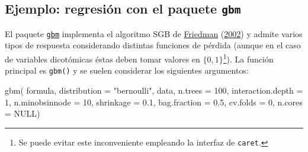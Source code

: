\documentclass[
  spanish,
]{book}
\newenvironment{Shaded}{\begin{snugshade}}{\end{snugshade}}
\newcommand{\AttributeTok}[1]{\textcolor[rgb]{0.77,0.63,0.00}{#1}}
\newcommand{\ConstantTok}[1]{\textcolor[rgb]{0.00,0.00,0.00}{#1}}
\newcommand{\DecValTok}[1]{\textcolor[rgb]{0.00,0.00,0.81}{#1}}
\newcommand{\FloatTok}[1]{\textcolor[rgb]{0.00,0.00,0.81}{#1}}
\newcommand{\FunctionTok}[1]{\textcolor[rgb]{0.00,0.00,0.00}{#1}}
\newcommand{\NormalTok}[1]{#1}
\newcommand{\StringTok}[1]{\textcolor[rgb]{0.31,0.60,0.02}{#1}}
\theoremstyle{break}
\theoremstyle{definition}
\theoremstyle{definition}
\theoremstyle{definition}
\theoremstyle{definition}
\theoremstyle{remark}
\begin{document}
\hypertarget{ejemplo-regresiuxf3n-con-el-paquete-gbm}{%
\subsection{\texorpdfstring{Ejemplo: regresión con el paquete \texttt{gbm}}{Ejemplo: regresión con el paquete gbm}}\label{ejemplo-regresiuxf3n-con-el-paquete-gbm}}

El paquete \href{https://CRAN.R-project.org/package=gbm}{\texttt{gbm}} implementa el algoritmo SGB de \protect\hyperlink{ref-friedman2002stochastic}{Friedman} (\protect\hyperlink{ref-friedman2002stochastic}{2002}) y admite varios tipos de respuesta considerando distintas funciones de pérdida (aunque en el caso de variables dicotómicas éstas deben tomar valores en \(\{0, 1\}\)\footnote{Se puede evitar este inconveniente empleando la interfaz de \texttt{caret}.}).
La función principal es \texttt{gbm()} y se suelen considerar los siguientes argumentos:

\begin{Shaded}
\begin{Highlighting}[]
\FunctionTok{gbm}\NormalTok{( formula, }\AttributeTok{distribution =} \StringTok{"bernoulli"}\NormalTok{, data, }\AttributeTok{n.trees =} \DecValTok{100}\NormalTok{, }
     \AttributeTok{interaction.depth =} \DecValTok{1}\NormalTok{, }\AttributeTok{n.minobsinnode =} \DecValTok{10}\NormalTok{,}
     \AttributeTok{shrinkage =} \FloatTok{0.1}\NormalTok{, }\AttributeTok{bag.fraction =} \FloatTok{0.5}\NormalTok{, }
     \AttributeTok{cv.folds =} \DecValTok{0}\NormalTok{, }\AttributeTok{n.cores =} \ConstantTok{NULL}\NormalTok{)}
\end{Highlighting}
\end{Shaded}
\end{document}
